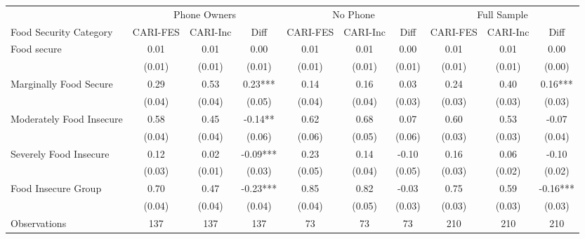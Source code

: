 \begin{tabular}{l*{9}c}
	\hline\hline
	\multicolumn{1}{c}{}     & \multicolumn{3}{c}{Phone Owners} & \multicolumn{3}{c}{No Phone} & \multicolumn{3}{c}{Full Sample}     \\
	Food Security Category   & CARI-FES  & CARI-Inc & Diff     & CARI-FES & CARI-Inc & Diff     & CARI-FES & CARI-Inc & Diff     \\ 	
	\hline
	Food secure              & 0.01      & 0.01      & 0.00     & 0.01     & 0.01     & 0.00   & 0.01      & 0.01     & 0.00     \\
	& (0.01)    & (0.01)    & (0.01)   & (0.01)   & (0.01)   & (0.01) & (0.01)    & (0.01)   & (0.00)   \\
	Marginally Food Secure   & 0.29      & 0.53      & 0.23***  & 0.14     & 0.16     & 0.03   & 0.24      & 0.40     & 0.16***  \\
	& (0.04)    & (0.04)    & (0.05)   & (0.04)   & (0.04)   & (0.03) & (0.03)    & (0.03)   & (0.03)   \\
	Moderately Food Insecure & 0.58      & 0.45      & -0.14**  & 0.62     & 0.68     & 0.07   & 0.60      & 0.53     & -0.07    \\
	& (0.04)    & (0.04)    & (0.06)   & (0.06)   & (0.05)   & (0.06) & (0.03)    & (0.03)   & (0.04)   \\
	Severely Food Insecure   & 0.12      & 0.02      & -0.09*** & 0.23     & 0.14     & -0.10  & 0.16      & 0.06     & -0.10    \\
	& (0.03)    & (0.01)    & (0.03)   & (0.05)   & (0.04)   & (0.05) & (0.03)    & (0.02)   & (0.02)   \\
	Food Insecure Group      & 0.70      & 0.47      & -0.23***  & 0.85     & 0.82     & -0.03  & 0.75      & 0.59     & -0.16*** \\
	& (0.04)    & (0.04)    & (0.04)   & (0.04)   & (0.05)   & (0.03) & (0.03)    & (0.03)   & (0.03)   \\
	\hline
	Observations             & 137       & 137       & 137      & 73       & 73       & 73     & 210       & 210      & 210       \\
	\hline\hline
\end{tabular}









